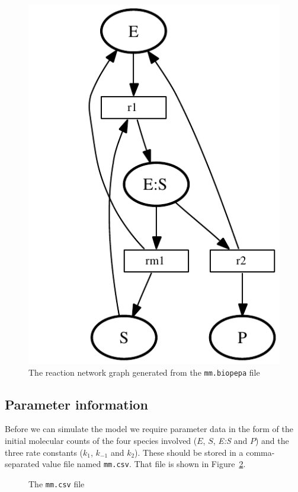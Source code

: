 \documentclass[11pt,a4paper]{article}
\begin{document}
\begin{figure}[htbp]
\begin{center}
\includegraphics[scale=0.4]{mm.pdf}
\end{center}
\caption{\label{fig:mm.pdf} The reaction network graph generated 
  from the \texttt{mm.biopepa} file}
\end{figure}

\subsection{Parameter information}

Before we can simulate the model we require parameter data in the form
of the initial molecular counts of the four species involved ($E$,
$S$, \textit{E:S} and $P$) and the three rate constants ($k_1$,
$k_{-1}$ and $k_2$).  These should be stored in a comma-separated
value file named \texttt{mm.csv}.  That file is shown in 
Figure~\ref{fig:mm.csv}.

\begin{figure}[htbp]

\caption{\label{fig:mm.csv} The \texttt{mm.csv} file}
\end{figure}
\end{document}
